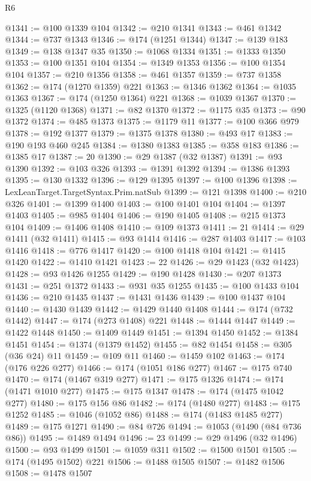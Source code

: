 \begin{lexlean}{R6}
\begin{coremodule}
@1341 := @100 @1339 @104
@1342 := @210 @1341
@1343 := @461 @1342
@1344 := @737 @1343
@1346 := @174 (@1251 @1344)
@1347 := @139 @183
@1349 := @138 @1347 @35
@1350 := @1068 @1334
@1351 := @1333 @1350
@1353 := @100 @1351 @104
@1354 := @1349 @1353
@1356 := @100 @1354 @104
@1357 := @210 @1356
@1358 := @461 @1357
@1359 := @737 @1358
@1362 := @174 (@1270 @1359) @221
@1363 := @1346 @1362
@1364 := @1035 @1363
@1367 := @174 (@1250 @1364) @221
@1368 := @1039 @1367
@1370 := @1325 (@1120 @1368)
@1371 := @82 @1370
@1372 := @1175 @35
@1373 := @90 @1372
@1374 := @485 @1373
@1375 := @1179 @11
@1377 := @100 @366 @979
@1378 := @192 @1377
@1379 := @1375 @1378
@1380 := @493 @17
@1383 := @190 @193 @460 @245
@1384 := @1380 @1383
@1385 := @358 @183
@1386 := @1385 @17
@1387 := 20
@1390 := @29 @1387 (@32 @1387)
@1391 := @93 @1390
@1392 := @103 @326
@1393 := @1391 @1392
@1394 := @1386 @1393
@1395 := @130 @1332
@1396 := @129 @1395
@1397 := @100 @1396
@1398 := LexLeanTarget.TargetSyntax.Prim.natSub
@1399 := @121 @1398
@1400 := @210 @326
@1401 := @1399 @1400
@1403 := @100 @1401 @104
@1404 := @1397 @1403
@1405 := @985 @1404
@1406 := @190 @1405
@1408 := @215 @1373 @104
@1409 := @1406 @1408
@1410 := @109 @1373
@1411 := 21
@1414 := @29 @1411 (@32 @1411)
@1415 := @93 @1414
@1416 := @287 @1403
@1417 := @103 @1416
@1418 := @776 @1417
@1420 := @100 @1418 @104
@1421 := @1415 @1420
@1422 := @1410 @1421
@1423 := 22
@1426 := @29 @1423 (@32 @1423)
@1428 := @93 @1426 @1255
@1429 := @190 @1428
@1430 := @207 @1373
@1431 := @251 @1372
@1433 := @931 @35 @1255
@1435 := @100 @1433 @104
@1436 := @210 @1435
@1437 := @1431 @1436
@1439 := @100 @1437 @104
@1440 := @1430 @1439
@1442 := @1429 @1440 @1408
@1444 := @174 (@732 @1442)
@1447 := @174 (@273 @1408) @221
@1448 := @1444 @1447
@1449 := @1422 @1448
@1450 := @1409 @1449
@1451 := @1394 @1450
@1452 := @1384 @1451
@1454 := @1374 (@1379 @1452)
@1455 := @82 @1454
@1458 := @305 (@36 @24) @11
@1459 := @109 @11
@1460 := @1459 @102
@1463 := @174 (@176 @226 @277)
@1466 := @174 (@1051 @186 @277)
@1467 := @175 @740
@1470 := @174 (@1467 @319 @277)
@1471 := @175 @1326
@1474 := @174 (@1471 @1010 @277)
@1475 := @175 @1347
@1478 := @174 (@1475 @1042 @277)
@1480 := @175 @156 @86
@1482 := @174 (@1480 @277)
@1483 := @175 @1252
@1485 := @1046 (@1052 @86)
@1488 := @174 (@1483 @1485 @277)
@1489 := @175 @1271
@1490 := @84 @726
@1494 := @1053 (@1490 (@84 @736 @86))
@1495 := @1489 @1494
@1496 := 23
@1499 := @29 @1496 (@32 @1496)
@1500 := @93 @1499
@1501 := @1059 @311
@1502 := @1500 @1501
@1505 := @174 (@1495 @1502) @221
@1506 := @1488 @1505
@1507 := @1482 @1506
@1508 := @1478 @1507

\end{coremodule}
\end{lexlean}
